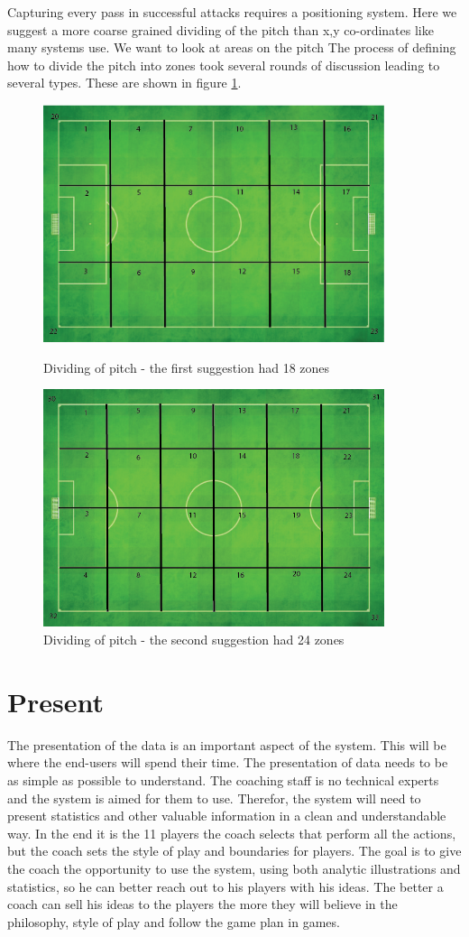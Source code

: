 Capturing every pass in successful attacks requires a positioning system. Here we suggest a more coarse grained dividing of the pitch than x,y co-ordinates like many systems use. We want to look at areas on the pitch The process of defining how to divide the pitch into zones took several rounds of discussion leading to several types. These are shown in figure \ref{fig:zones}.

\begin{figure}[ht!]
\centering
\includegraphics[width=100mm]{images/general/first_zones.png}
\caption{Dividing of pitch - the first suggestion had 18 zones}
\includegraphics[width=100mm]{images/general/second_zones.png}
\caption{Dividing of pitch - the second suggestion had 24 zones}
\label{fig:zones}
\end{figure}


\section{Present}

The presentation of the data is an important aspect of the system. This will be where the end-users will spend their time. The presentation of data needs to be as simple as possible to understand. The coaching staff is no technical experts and the system is aimed for them to use. Therefor, the system will need to present statistics and other valuable information in a clean and understandable way. In the end it is the 11 players the coach selects that perform all the actions, but the coach sets the style of play and boundaries for players. The goal is to give the coach the opportunity to use the system, using both analytic illustrations and statistics, so he can better reach out to his players with his ideas. The better a coach can sell his ideas to the players the more they will believe in the philosophy, style of play and follow the game plan in games.

